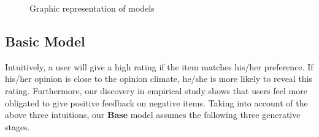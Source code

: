 \documentclass[sigconf]{acmart}
\begin{document}
\begin{figure}[htbp]
\centering
{}
\vspace{-1em}
\hspace{-1em}
\vspace{-1em}
\hspace{-1em}
\caption{Graphic representation of models}\label{fig:model}
\end{figure}
\subsection{Basic Model}

Intuitively, a user will give a high rating if the item matches his/her preference. If his/her opinion is close to the opinion climate, he/she is more likely to reveal this rating. Furthermore, our  discovery in  empirical study shows that users feel more obligated to give positive feedback on negative items. Taking into account of the above three intuitions, our \textbf{Base} model assumes the following three generative stages.
\end{document}
